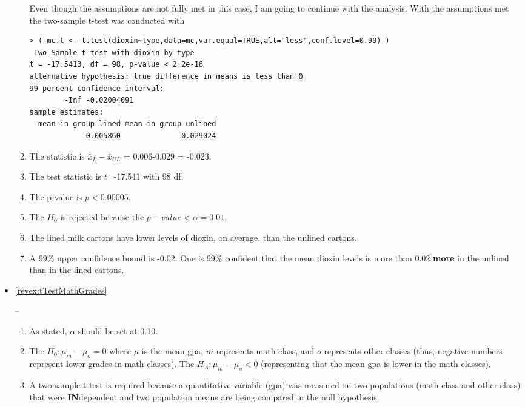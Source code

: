 \documentclass[10pt,openany]{book}\usepackage[]{graphicx}\usepackage[]{color}
\makeatletter
\newenvironment{kframe}{%
 \def\at@end@of@kframe{}%
 \ifinner\ifhmode%
  \def\at@end@of@kframe{\end{minipage}}%
  \begin{minipage}{\columnwidth}%
 \fi\fi%
 \def\FrameCommand##1{\hskip\@totalleftmargin \hskip-\fboxsep
 \colorbox{shadecolor}{##1}\hskip-\fboxsep
     \hskip-\linewidth \hskip-\@totalleftmargin \hskip\columnwidth}%
 \MakeFramed {\advance\hsize-\width
   \@totalleftmargin\z@ \linewidth\hsize
   \@setminipage}}%
 {\par\unskip\endMakeFramed%
 \at@end@of@kframe}
\newenvironment{knitrout}{}{} %
\makeatother
\begin{document}
\begin{itemize}
\begin{enumerate}
\begin{knitrout}
\begin{kframe}
\begin{verbatim}
\end{verbatim}
\end{kframe}
\end{knitrout}
Even though the assumptions are not fully met in this case, I am going to continue with the analysis.  With the assumptions met the two-sample t-test was conducted with
\begin{knitrout}
\color{fgcolor}\begin{kframe}
\begin{verbatim}
> ( mc.t <- t.test(dioxin~type,data=mc,var.equal=TRUE,alt="less",conf.level=0.99) )
 Two Sample t-test with dioxin by type 
t = -17.5413, df = 98, p-value < 2.2e-16
alternative hypothesis: true difference in means is less than 0 
99 percent confidence interval:
        -Inf -0.02004091 
sample estimates:
  mean in group lined mean in group unlined 
             0.005860              0.029024 
\end{verbatim}
\end{kframe}
\end{knitrout}
      \item The statistic is $\bar{x}_{L}-\bar{x}_{UL}$ = 0.006-0.029 = -0.023.
      \item The test statistic is $t$=-17.541 with 98 df.
      \item The p-value is $p<0.00005$.
      \item The $H_{0}$ is rejected because the $p-value <\alpha=0.01$.
      \item The lined milk cartons have lower levels of dioxin, on average, than the unlined cartons.
      \item A 99\% upper confidence bound is -0.02.  One is 99\% confident that the mean dioxin levels is more than 0.02 \textbf{more} in the unlined than in the lined cartons.
    \end{enumerate}
  \item \hypertarget{ans:tTestMathGrades}{\ref{revex:tTestMathGrades}} --
    \begin{enumerate}
      \item As stated, $\alpha$ should be set at 0.10.
      \item The $H_{0}:\mu_{m}-\mu_{o}=0$ where $\mu$ is the mean gpa, $m$ represents math class, and $o$ represents other classes (thus, negative numbers represent lower grades in math classes).  The $H_{A}:\mu_{m}-\mu_{o}<0$ (representing that the mean gpa is lower in the math classes).
      \item A two-sample t-test is required because a quantitative variable (gpa) was measured on two populations (math class and other class) that were \textbf{IN}dependent and two population means are being compared in the null hypothesis.

\end{enumerate}
\end{itemize}
\end{document}
